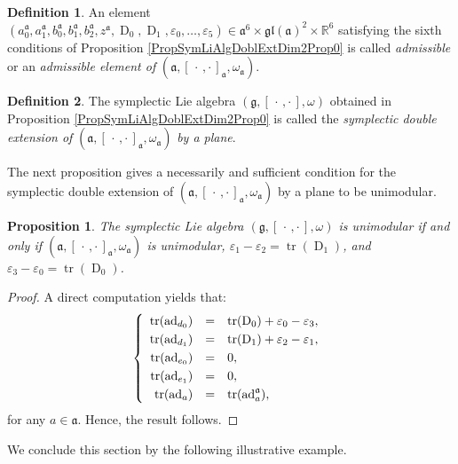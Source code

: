\documentclass[final,1p,times,nopreprintline]{elsarticle}
\newtheorem{proposition}{Proposition}[section]
\theoremstyle{definition}
\newtheorem{definition}{Definition}[section]
\numberwithin{equation}{section}
\newcommand{\rel}{\mathbb{R}}
\newcommand{\w}{\omega}
\newcommand{\tr}{\operatorname{tr}}
\newcommand{\g}{\mathfrak{g}}
\newcommand{\ai}{\mathfrak{a}}
\newcommand{\ad}{\operatorname{ad}}
\numberwithin{equation}{section}
\newcommand{\D}{\operatorname{D}}
\newcommand{\gl}{\mathfrak{gl}}
\newcommand{\cro}{[\,\cdot\,,\cdot\,]}
\begin{document}
\begin{definition}\label{AdmiSDIm2}
	An element $(a^\ai_0,a^\ai_1,b^\ai_0,b^\ai_1,b^\ai_2,z^\ai,\D_0,\D_1,\varepsilon_0,\ldots,\varepsilon_5)\in\ai^6\times\gl(\ai)^2\times\rel^6$ satisfying the sixth conditions of Proposition \ref{PropSymLiAlgDoblExtDim2Prop0} is called \textit{admissible} or an \textit{admissible element of} $(\ai,\cro_\ai,\w_\ai)$.
\end{definition}


\begin{definition}
	The symplectic Lie algebra $(\g,\cro,\w)$ obtained in Proposition \ref{PropSymLiAlgDoblExtDim2Prop0} is called the \textit{symplectic double extension of} $(\ai,\cro_\ai,\w_\ai)$ \textit{by a plane}.
\end{definition}

The next proposition gives a necessarily and sufficient condition for the symplectic double extension of $(\ai,\cro_\ai,\w_\ai)$ by a plane to be unimodular.

\begin{proposition}\label{PropSymLiAlgDoblExtDim2Prop01}
	The symplectic Lie algebra $(\g,[\,\cdot\,,\cdot\,],\w)$ is unimodular if and only if $(\ai,[\,\cdot\,,\cdot\,]_\ai,\w_\ai)$ is unimodular, $\varepsilon_1-\varepsilon_2=\tr(\D_1)$, and $\varepsilon_3-\varepsilon_0=\tr(\D_0)$. 
\end{proposition}

\begin{proof}
	A direct computation yields that:
	\begin{equation*}
		\left\{
		\begin{array}{r c l}\vspace{1mm}
			\tr(\ad_{d_0})&=&\tr(\D_0)+\varepsilon_0-\varepsilon_3,\\\vspace{1mm}
			\tr(\ad_{d_1})&=&\tr(\D_1)+\varepsilon_2-\varepsilon_1,\\\vspace{1mm}
			\tr(\ad_{e_0})&=&0,\\\vspace{1mm}
			\tr(\ad_{e_1})&=&0,\\
			\tr(\ad_a)&=&\tr(\ad_a^\ai),
		\end{array}
		\right.\\
	\end{equation*}
for any $a\in\ai$. Hence, the result follows.
\end{proof}

We conclude this section by the following illustrative example.
\end{document}

